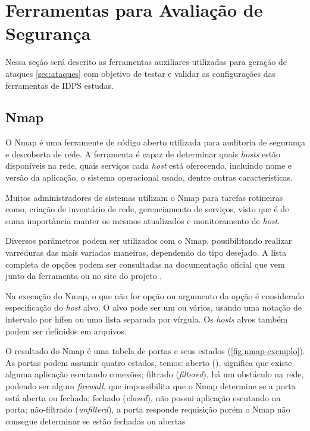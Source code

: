  \section{Ferramentas para Avaliação de Segurança} \label{sec:ferramentas}

 Nessa seção será descrito as ferramentas auxiliares utilizadas para geração de ataques \autoref{sec:ataques} com objetivo de testar e validar as configurações das ferramentas de IDPS estudas. 

 \subsection{Nmap} \label{sec:nmap}

 O Nmap é uma ferramente de código aberto utilizada para auditoria de segurança e descoberta de rede. A ferramenta é capaz de determinar quais \textit{hosts} estão disponíveis na rede, quais serviços cada \textit{host} está oferecendo, incluindo nome e versão da aplicação, o sistema operacional usado, dentre outras características.  

 Muitos administradores de sistemas utilizam o Nmap para tarefas rotineiras como, criação de inventário de rede, gerenciamento de serviços, visto que é de suma importância manter os mesmos atualizados e monitoramento de \textit{host}.

 Diversos parâmetros podem ser utilizados com o Nmap, possibilitando realizar varreduras das mais variadas maneiras, dependendo do tipo desejado. A lista completa de opções podem ser consultadas na documentação oficial que vem junto da ferramenta ou no site do projeto \cite{nmap}. 

 Na execução do Nmap, o que não for opção ou argumento da opção é considerado especificação do \textit{host} alvo. O alvo pode ser um ou vários, usando uma notação de intervalo por hífen ou uma lista separada por vírgula. Os \textit{hosts} alvos também podem ser definidos em arquivos.

 O resultado do Nmap é uma tabela de portas e seus estados (\autoref{fig:nmap-exemplo}). As portas podem assumir quatro estados, temos: aberto (), significa que existe alguma aplicação escutando conexões; filtrado (\textit{filtered}), há um obstáculo na rede, podendo ser algum \textit{firewall}, que impossibilita que o Nmap determine se a porta está aberta ou fechada; fechado (\textit{closed}), não possui aplicação escutando na porta; não-filtrado (\textit{unfilterd}), a porta responde requisição porém o Nmap não consegue determinar se estão fechadas ou abertas \cite{nmap}

